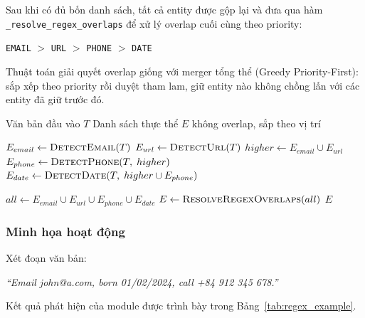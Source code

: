 Sau khi có đủ bốn danh sách, tất cả entity được gộp lại và đưa qua hàm
\texttt{\_resolve\_regex\_overlaps} để xử lý overlap cuối cùng theo priority:

\begin{center}
      \texttt{EMAIL} $>$ \texttt{URL} $>$ \texttt{PHONE} $>$ \texttt{DATE}
\end{center}

Thuật toán giải quyết overlap giống với merger tổng thể (Greedy Priority-First):
sắp xếp theo priority rồi duyệt tham lam, giữ entity nào không chồng lấn với
các entity đã giữ trước đó.

\begin{algorithm}[H]
      \caption{Pipeline nhận diện thực thể bằng regex}
      \label{alg:regex_pipeline}
      \begin{algorithmic}[1]
            \Require Văn bản đầu vào $T$
            \Ensure Danh sách thực thể $E$ không overlap, sắp theo vị trí

            \State $E_{email} \leftarrow \textsc{DetectEmail}(T)$
            \State $E_{url} \leftarrow \textsc{DetectUrl}(T)$
            \State $higher \leftarrow E_{email} \cup E_{url}$
            \State $E_{phone} \leftarrow \textsc{DetectPhone}(T,\; higher)$
            \State $E_{date} \leftarrow \textsc{DetectDate}(T,\; higher \cup E_{phone})$

            \State $all \leftarrow E_{email} \cup E_{url} \cup E_{phone} \cup E_{date}$
            \State $E \leftarrow \textsc{ResolveRegexOverlaps}(all)$
            \State \Return $E$
      \end{algorithmic}
\end{algorithm}

\subsubsection{Minh họa hoạt động}

Xét đoạn văn bản:

\begin{center}
      \textit{``Email john@a.com, born 01/02/2024, call +84 912 345 678.''}
\end{center}

Kết quả phát hiện của module được trình bày trong Bảng~\ref{tab:regex_example}.

